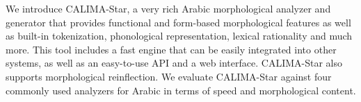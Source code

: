 We introduce CALIMA-Star, a very rich Arabic morphological analyzer and generator that provides functional and form-based morphological features as well as built-in tokenization, phonological representation, lexical rationality and much more. This tool includes a fast engine that can be easily integrated into other systems, as well as an easy-to-use API and a web interface. CALIMA-Star also supports morphological reinflection. We evaluate  CALIMA-Star against four commonly used analyzers for Arabic in terms of speed and morphological content.
